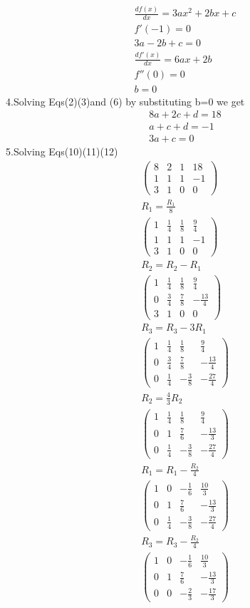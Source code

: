 \documentclass[a4paper,10pt]{report}
\newcommand{\myvec}[1]{\ensuremath{\begin{pmatrix}#1\end{pmatrix}}}
\begin{document}
\begin{multicols}{2}
\begin{align}
 \frac{df(x)}{dx} = 3ax^2+2bx+c\\
 f'(-1)=0\\
 3a-2b+c =0\\
 \frac{df'(x)}{dx} = 6ax+2b\\
 f''(0) = 0\\
 b=0
 \end{align}
4.Solving Eqs(2)(3)and (6) by substituting b=0 we get
\begin{align}
8a+2c+d=18\\
a+c+d=-1\\
3a+c=0
\end{align}
5.Solving Eqs(10)(11)(12)
\begin{align*}
\myvec {8&2&1&18 \\ 1&1&1&-1 \\ 3&1&0&0} \\ 
R_1 =\frac{R_1}{8}\\
\myvec {1&\frac{1}{4}&\frac{1}{8}&\frac{9}{4} \\ 1&1&1&-1 \\ 3&1&0&0} \\
R_2 = R_2-R_1\\
\myvec {1&\frac{1}{4}&\frac{1}{8}&\frac{9}{4} \\ 0&\frac{3}{4}&\frac{7}{8}&-\frac{13}{4} \\ 3&1&0&0} \\
R_3 = R_3-3R_1\\
\myvec {1&\frac{1}{4}&\frac{1}{8}&\frac{9}{4} \\ 0&\frac{3}{4}&\frac{7}{8}&-\frac{13}{4} \\ 0&\frac{1}{4}&-\frac{3}{8}&-\frac{27}{4}}\\  
R_2 = \frac{4}{3}R_2\\
 \myvec {1&\frac{1}{4}&\frac{1}{8}&\frac{9}{4} \\ 0&1&\frac{7}{6}&-\frac{13}{3} \\ 0&\frac{1}{4}&-\frac{3}{8}&-\frac{27}{4}}\\
 R_1 = R_1 - \frac{R_2}{4}\\
\myvec {1&0&-\frac{1}{6}&\frac{10}{3} \\ 0&1&\frac{7}{6}&-\frac{13}{3} \\ 0&\frac{1}{4}&-\frac{3}{8}&-\frac{27}{4}}\\
R_3 = R_3 - \frac{R_2}{4}\\
\myvec {1&0&-\frac{1}{6}&\frac{10}{3} \\ 0&1&\frac{7}{6}&-\frac{13}{3} \\ 0&0&-\frac{2}{3}&-\frac{17}{3}} \\

\end{align*}
\end{multicols}
\end{document}
